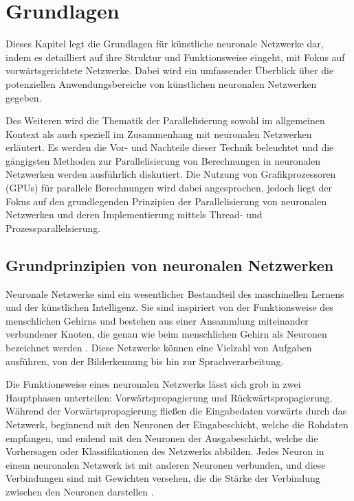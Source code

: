 \chapter{Grundlagen}
\label{ch:Grundlagen}

Dieses Kapitel legt die Grundlagen für künstliche neuronale Netzwerke dar, indem es detailliert auf ihre Struktur und Funktionsweise eingeht, mit Fokus auf vorwärtsgerichtete Netzwerke. Dabei wird ein umfassender Überblick über die potenziellen Anwendungsbereiche von künstlichen neuronalen Netzwerken gegeben.

Des Weiteren wird die Thematik der Parallelisierung sowohl im allgemeinen Kontext als auch speziell im Zusammenhang mit neuronalen Netzwerken erläutert. Es werden die Vor- und Nachteile dieser Technik beleuchtet und die gängigsten Methoden zur Parallelisierung von Berechnungen in neuronalen Netzwerken werden ausführlich diskutiert.
Die Nutzung von Grafikprozessoren (GPUs) für parallele Berechnungen wird dabei angesprochen, jedoch liegt der Fokus auf den grundlegenden Prinzipien der Parallelisierung von neuronalen Netzwerken und deren Implementierung mittels Thread- und Prozessparallelsierung.

\section{Grundprinzipien von neuronalen Netzwerken}
\label{sec:Grundlagen_Grundprinzipien_neuronale_Netze}
Neuronale Netzwerke sind ein wesentlicher Bestandteil des maschinellen Lernens und der künstlichen Intelligenz. Sie sind inspiriert von der Funktionsweise des menschlichen Gehirns und bestehen aus einer Ansammlung miteinander verbundener Knoten, die genau wie beim menschlichen Gehirn als Neuronen bezeichnet werden \citep{Manuela_Kunstliche_Intelligenz}. Diese Netzwerke können eine Vielzahl von Aufgaben ausführen, von der Bilderkennung bis hin zur Sprachverarbeitung.

Die Funktionsweise eines neuronalen Netzwerks lässt sich grob in zwei Hauptphasen unterteilen: Vorwärtspropagierung und Rückwärtspropagierung. Während der Vorwärtspropagierung fließen die Eingabedaten vorwärts durch das Netzwerk, beginnend mit den Neuronen der Eingabeschicht, welche die Rohdaten empfangen, und endend mit den Neuronen der Ausgabeschicht, welche die Vorhersagen oder Klassifikationen des Netzwerks abbilden. Jedes Neuron in einem neuronalen Netzwerk ist mit anderen Neuronen verbunden, und diese Verbindungen sind mit Gewichten versehen, die die Stärke der Verbindung zwischen den Neuronen darstellen  \citep{Manuela_Kunstliche_Intelligenz}.

